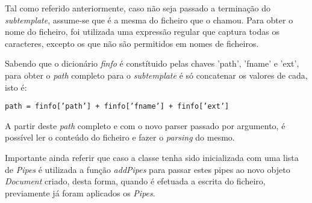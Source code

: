 \documentclass[../relatorio.tex]{subfiles}
\begin{document}
    Tal como referido anteriormente, caso não seja passado a terminação do \textit{subtemplate}, assume-se que 
    é a mesma do ficheiro que o chamou. Para obter o nome do ficheiro, foi utilizada uma expressão regular que captura
    todas os caracteres, excepto os que não são permitidos em nomes de ficheiros.

    Sabendo que o dicionário \textit{finfo} é constítuido pelas chaves 'path', 'fname' e 'ext', para obter o \textit{path}
    completo para o \textit{subtemplate} é só concatenar os valores de cada, isto é:

    \texttt{path = finfo['path'] + finfo['fname'] + finfo['ext']}

    A partir deste \textit{path} completo e com o novo parser passado por argumento, é possível ler o conteúdo do ficheiro
    e fazer o \textit{parsing} do mesmo. 
    
    Importante ainda referir que caso a classe tenha sido inicializada com uma lista de
    \textit{Pipes} é utilizada a função \textit{addPipes} para passar estes pipes ao novo objeto \textit{Document} criado,
    desta forma, quando é efetuada a escrita do ficheiro, previamente já foram aplicados os \textit{Pipes}.
\end{document}
